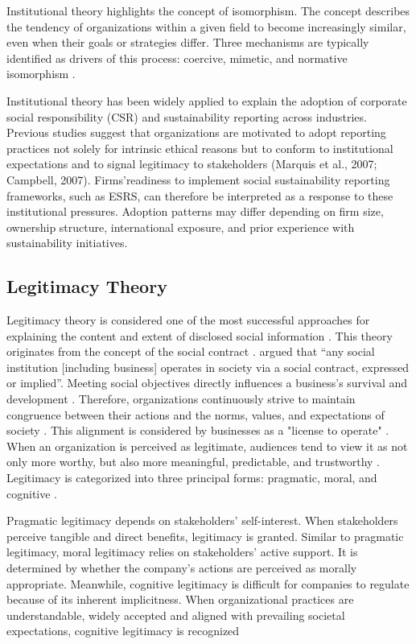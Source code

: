 Institutional theory highlights the concept of isomorphism. The concept describes the tendency of 
organizations within a given field to become increasingly similar, even when their goals or strategies 
differ. Three mechanisms are typically identified as drivers of this process: coercive, mimetic, 
and normative isomorphism \parencite{DiMaggio1983}.

Institutional theory has been widely applied to explain the adoption of corporate social responsibility 
(CSR) and sustainability reporting across industries. Previous studies suggest that organizations are 
motivated to adopt reporting practices not solely for intrinsic ethical reasons but to conform to institutional 
expectations and to signal legitimacy to stakeholders (Marquis et al., 2007; Campbell, 2007). Firms'readiness 
to implement social sustainability reporting frameworks, such as ESRS, can therefore be interpreted as a response 
to these institutional pressures. Adoption patterns may differ depending on firm size, ownership structure, 
international exposure, and prior experience with sustainability initiatives.

\subsection{Legitimacy Theory}

Legitimacy theory is considered one of the most successful approaches for explaining the content 
and extent of disclosed social information \parencite{Grey1995}. This theory originates from the concept of the social 
contract \parencite{Patten1991}. \textcite{Schoker1974} argued that “any social institution [including business] 
operates in society via a social contract, expressed or implied”. Meeting social objectives directly influences 
a business's survival and development \parencite{Schoker1974}. Therefore, organizations continuously strive to 
maintain congruence between their actions and the norms, values, and expectations of society \parencite{Suchman1995}. 
This alignment is considered by businesses as a "license to operate" \parencite{Demuijnck2016}. When an organization 
is perceived as legitimate, audiences tend to view it as not only more worthy, but also more meaningful, predictable, 
and trustworthy \parencite{Suchman1995}. Legitimacy is categorized into three principal forms: pragmatic, moral, and cognitive
\parencite{Suchman1995}. 

Pragmatic legitimacy depends on stakeholders' self-interest. When stakeholders perceive tangible 
and direct benefits, legitimacy is granted. Similar to pragmatic legitimacy, moral legitimacy relies on stakeholders' 
active support. It is determined by 
whether the company's actions are perceived as morally appropriate. Meanwhile, cognitive legitimacy is difficult 
for companies to regulate because of its inherent implicitness. When organizational practices are understandable, 
widely accepted and aligned with prevailing societal expectations, cognitive legitimacy is recognized \parencite{Suchmann1995}

